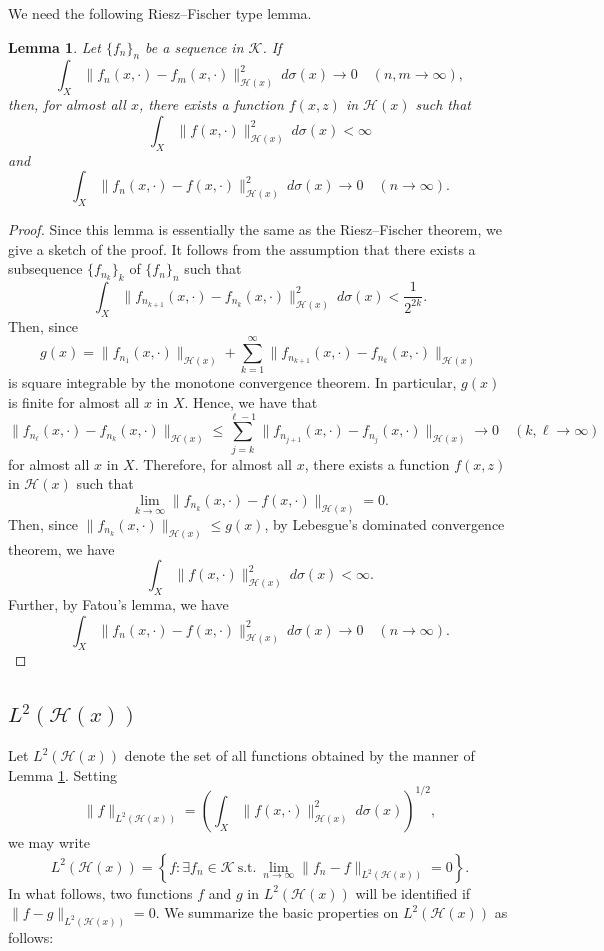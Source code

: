 \documentclass[12pt]{article}
\newtheorem{lem}[thm]{Lemma}
\numberwithin{equation}{section}
\newcommand{\cH}{{\mathcal H}}
\newcommand{\cK}{{\mathcal K}}
\begin{document}
We need the following Riesz--Fischer type lemma. 

\begin{lem}\label{lem:4-1}
Let $\{f_n\}_n$ be a sequence in $\cK$. 
If 
\[
\int_X\|f_n(x,\cdot)-f_m(x,\cdot)\|_{\cH(x)}^2\ d\sigma(x)\to 0\quad(n,m\to \infty),
\] 
then, 
for almost all $x$,   
there exists a function $f(x, z)$ in $\cH(x)$ such that 
\[
\int_X\|f(x,\cdot)\|_{\cH(x)}^2\ d\sigma(x)<\infty
\]
and
\[
\int_X\|f_n(x,\cdot)-f(x,\cdot)\|_{\cH(x)}^2\ d\sigma(x)\to 0\quad(n\to \infty).
\] 
\end{lem}

\begin{proof}
Since this lemma is essentially the same as the Riesz--Fischer theorem, 
we give a sketch of the proof. 
It follows from the assumption that 
there exists a subsequence $\{f_{n_k}\}_k$ of $\{f_n\}_n$ such that 
\[
\int_X \|f_{n_{k+1}}(x,\cdot)-f_{n_k}(x,\cdot)\|_{\cH(x)}^2\ d\sigma(x)<\frac{1}{2^{2k}}. 
\]
Then, since 
\[
g(x)=\|f_{n_1}(x,\cdot)\|_{\cH(x)}+\sum_{k=1}^{\infty}\|f_{n_{k+1}}(x,\cdot)-f_{n_k}(x,\cdot)\|_{\cH(x)} 
\]
is square integrable by the monotone convergence theorem. 
In particular, $g(x)$ is finite for almost all $x$ in $X$. 
Hence,
we have that
\[
\|f_{n_{\ell}}(x,\cdot)-f_{n_k}(x,\cdot)\|_{\cH(x)}
\leq \sum_{j=k}^{\ell-1}\|f_{n_{j+1}}(x,\cdot)-f_{n_j}(x,\cdot)\|_{\cH(x)}\to 0\quad(k,\ell\to\infty)
\]
for almost all $x$ in $X$. 
Therefore, 
for almost all $x$,   
there exists a function $f(x, z)$ in $\cH(x)$ 
such that 
\[
\lim_{k\to \infty}\|f_{n_k}(x,\cdot)-f(x,\cdot)\|_{\cH(x)}=0. 
\]
Then, 
since $\|f_{n_k}(x,\cdot)\|_{\cH(x)}\leq g(x)$, 
by Lebesgue's dominated convergence theorem, we have 
\[
\int_X\|f(x,\cdot)\|_{\cH(x)}^2\ d\sigma(x)<\infty.
\]
Further, 
by Fatou's lemma, we have 
\[
\int_X\|f_n(x,\cdot)-f(x,\cdot)\|_{\cH(x)}^2\ d\sigma(x)\to 0\quad(n\to \infty).
\] 
\end{proof}


\subsection{$L^2(\cH(x))$}
Let $L^2(\cH(x))$ denote the set of all functions obtained by the manner of Lemma \ref{lem:4-1}. 
Setting 
\[
\|f\|_{L^2(\cH(x))}=\left(
\int_X \|f(x,\cdot)\|_{\cH(x)}^2\ d\sigma(x)
\right)^{1/2}, 
\]
we may write  
\[
L^2(\cH(x))=\left\{f:\exists f_n\in \cK\ \mbox{s.t.}\ 
\lim_{n\to \infty}\|f_n-f\|_{L^2(\cH(x))}=0\right\}. 
\]
In what follows, two functions 
$f$ and $g$ in $L^2(\cH(x))$ will be identified if 
$\|f-g\|_{L^2(\cH(x))}=0$.
We summarize the basic properties on $L^2(\cH(x))$ as follows: 
\end{document}
